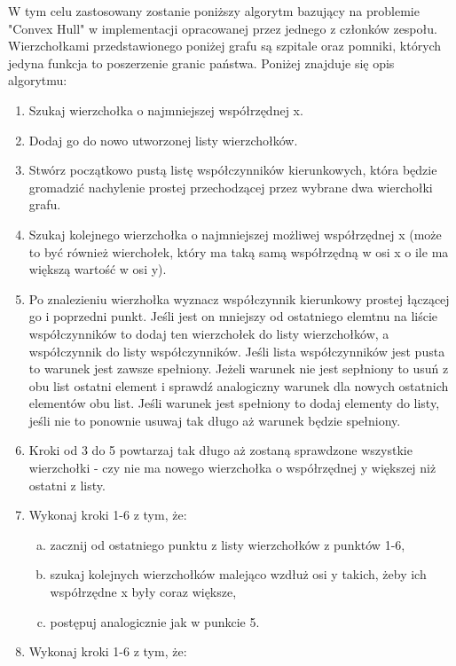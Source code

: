 \documentclass[10pt,a4paper]{article}
\begin{document}
W tym celu zastosowany zostanie poniższy algorytm bazujący na problemie "Convex Hull" w implementacji opracowanej przez jednego z członków zespołu.
Wierzchołkami przedstawionego poniżej grafu są szpitale oraz pomniki, których jedyna funkcja to poszerzenie granic państwa.
Poniżej znajduje się opis algorytmu:

\begin{enumerate}
    \item Szukaj wierzchołka o najmniejszej współrzędnej x.
    \item Dodaj go do nowo utworzonej listy wierzchołków.
    \item Stwórz początkowo pustą listę współczynników kierunkowych, która będzie gromadzić nachylenie prostej przechodzącej przez wybrane dwa wierchołki grafu.
    \item Szukaj kolejnego wierzchołka o najmniejszej możliwej współrzędnej x (może to być również wierchołek, który ma taką samą współrzędną w osi x o ile ma większą wartość w osi y).
    \item Po znalezieniu wierzhołka wyznacz współczynnik kierunkowy prostej łączącej go i poprzedni punkt. Jeśli jest on mniejszy od ostatniego elemtnu na liście współczynników to dodaj ten wierzchołek do listy wierzchołków, a współczynnik do listy współczynników. Jeśli lista współczynników jest pusta to warunek jest zawsze spełniony. Jeżeli warunek nie jest sepłniony to usuń z obu list ostatni element i sprawdź analogiczny warunek dla nowych ostatnich elementów obu list. Jeśli warunek jest spełniony to dodaj elementy do listy, jeśli nie to ponownie usuwaj tak długo aż warunek będzie spełniony.
    \item Kroki od 3 do 5 powtarzaj tak długo aż zostaną sprawdzone wszystkie wierzchołki - czy nie ma nowego wierzchołka o współrzędnej y większej niż ostatni z listy.
    \item Wykonaj kroki 1-6 z tym, że:
    \begin{enumerate}[a)]
        \item zacznij od ostatniego punktu z listy wierzchołków z punktów 1-6,
        \item szukaj kolejnych wierzchołków malejąco wzdłuż osi y takich, żeby ich współrzędne x były coraz większe,
        \item postępuj analogicznie jak w punkcie 5.
    \end{enumerate}
    \item Wykonaj kroki 1-6 z tym, że:
    \begin{enumerate}[a)]

\end{enumerate}
\end{enumerate}
\end{document}
